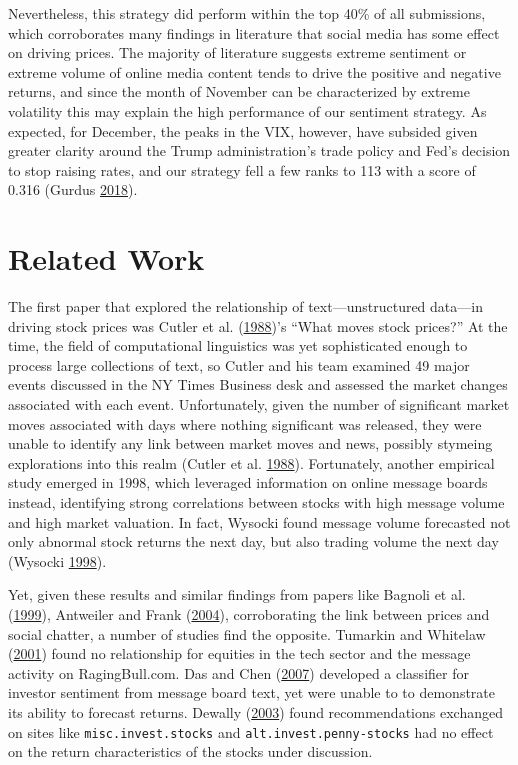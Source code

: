 \documentclass[11,]{article}
\begin{document}
Nevertheless, this strategy did perform within the top 40\% of all
submissions, which corroborates many findings in literature that social
media has some effect on driving prices. The majority of literature
suggests extreme sentiment or extreme volume of online media content
tends to drive the positive and negative returns, and since the month of
November can be characterized by extreme volatility this may explain the
high performance of our sentiment strategy. As expected, for December,
the peaks in the VIX, however, have subsided given greater clarity
around the Trump administration's trade policy and Fed's decision to
stop raising rates, and our strategy fell a few ranks to 113 with a
score of 0.316 (Gurdus \protect\hyperlink{ref-cramer2018}{2018}).

\hypertarget{related-work}{%
\section{Related Work}\label{related-work}}

The first paper that explored the relationship of text---unstructured
data---in driving stock prices was Cutler et al.
(\protect\hyperlink{ref-cutler1988}{1988})'s ``What moves stock
prices?'' At the time, the field of computational linguistics was yet
sophisticated enough to process large collections of text, so Cutler and
his team examined 49 major events discussed in the NY Times Business
desk and assessed the market changes associated with each event.
Unfortunately, given the number of significant market moves associated
with days where nothing significant was released, they were unable to
identify any link between market moves and news, possibly stymeing
explorations into this realm (Cutler et al.
\protect\hyperlink{ref-cutler1988}{1988}). Fortunately, another
empirical study emerged in 1998, which leveraged information on online
message boards instead, identifying strong correlations between stocks
with high message volume and high market valuation. In fact, Wysocki
found message volume forecasted not only abnormal stock returns the next
day, but also trading volume the next day (Wysocki
\protect\hyperlink{ref-wysocki1998}{1998}).

Yet, given these results and similar findings from papers like Bagnoli
et al. (\protect\hyperlink{ref-bagnoli1999}{1999}), Antweiler and Frank
(\protect\hyperlink{ref-antweiler2004}{2004}), corroborating the link
between prices and social chatter, a number of studies find the
opposite. Tumarkin and Whitelaw
(\protect\hyperlink{ref-tumarkin2001}{2001}) found no relationship for
equities in the tech sector and the message activity on RagingBull.com.
Das and Chen (\protect\hyperlink{ref-das2007}{2007}) developed a
classifier for investor sentiment from message board text, yet were
unable to to demonstrate its ability to forecast returns. Dewally
(\protect\hyperlink{ref-dewally2003}{2003}) found recommendations
exchanged on sites like \texttt{misc.invest.stocks} and
\texttt{alt.invest.penny-stocks} had no effect on the return
characteristics of the stocks under discussion.
\end{document}
